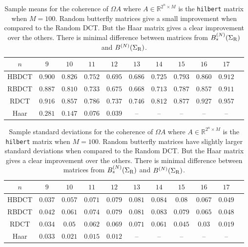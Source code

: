 \documentclass{amsart}
\theoremstyle{definition}
\theoremstyle{remark}
\numberwithin{equation}{section}
\begin{document}
\begin{table}[h]
\begin{tabular}{|c|c|c|c|c|c|c|c|c|c|c|} %
  \hline
 $n$ &  $9$ & $10$ & $11$ & $12$ & $13$ & $14$ & $15$ & $16$ & $17$\\
  \hline
  HBDCT& $0.900$ & $0.826$ & $0.752$ & $0.695$ & $0.686$ & $0.725$ & $0.793$ & $0.860$ & $0.912$\\
  RBDCT& $0.887$ & $0.810$ & $0.733$ & $0.675$ & $0.668$ & $0.713$ & $0.787$ & $0.857$ & $0.911$\\
RDCT& $0.916$ & $0.857$ & $0.786$ & $0.737$ & $0.746$ & $0.812$ & $0.877$ & $0.927$ & $0.957$\\
Haar &  $0.281$ & $0.147$ & $0.076$ & $0.039$ & -- & -- & -- & -- & --\\
  \hline
\end{tabular}
\caption{ \label{t:hilbert-mean} Sample means for the coherence of $\Omega A$ where $A \in \mathbb R^{2^n \times M}$ is the {\tt hilbert} matrix when $M = 100$.  Random butterfly matrices give a small improvement when compared to the Random DCT. But the Haar matrix gives a clear improvement over the others.  There is minimal difference between matrices from $B_s^{(N)}(\Sigma_{\mathrm R})$ and $B^{(N)}(\Sigma_{\mathrm R})  $.}
\end{table}

\begin{table}[h]
\begin{tabular}{|c|c|c|c|c|c|c|c|c|c|c|} %
  \hline
 $n$ &  $9$ & $10$ & $11$ & $12$ & $13$ & $14$ & $15$ & $16$ & $17$\\
  \hline
HBDCT& $0.037$ & $0.057$ & $0.071$ & $0.079$ & $0.081$ & $0.084$ & $0.08$ & $0.067$ & $0.049$\\
RBDCT&$0.042$ & $0.061$ & $0.074$ & $0.079$ & $0.081$ & $0.083$ & $0.079$ & $0.065$ & $0.048$\\
RDCT&$0.034$ & $0.05$ & $0.062$ & $0.069$ & $0.071$ & $0.061$ & $0.045$ & $0.03$ & $0.019$\\
Haar&$0.033$ & $0.021$ & $0.015$ & $0.012$ & -- & -- & -- & -- & --\\
  \hline
\end{tabular}
\caption{\label{t:hilbert-std} Sample standard deviations for the coherence of $\Omega A$ where $A \in \mathbb R^{2^n \times M}$ is the {\tt hilbert} matrix  when $M = 100$.  Random butterfly matrices have slightly larger standard deviations when compared to the Random DCT. But the Haar matrix gives a clear improvement over the others.  There is minimal difference between matrices from $B_s^{(N)}(\Sigma_{\mathrm R})$ and $B^{(N)}(\Sigma_{\mathrm R})  $.}
\end{table}
\end{document}
